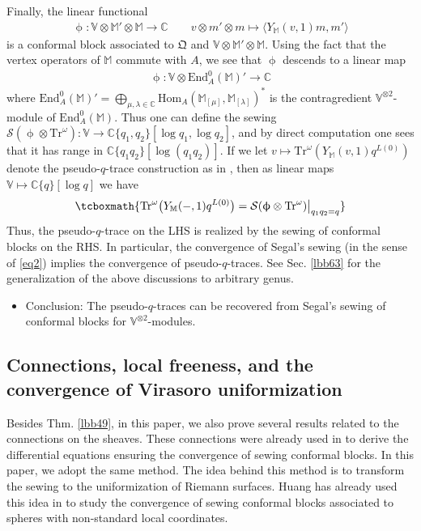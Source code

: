 \documentclass[11pt,b5paper,notitlepage]{article}
\theoremstyle{definition}
\theoremstyle{plain}
\newcommand{\Tr}{\mathrm{Tr}}
\newcommand{\End}{\mathrm{End}} %
\newcommand{\Hom}{\mathrm{Hom}}
\newcommand{\blt}{\bullet}
\newcommand{\Vbb}{\mathbb V}
\newcommand{\Mbb}{\mathbb M}
\newcommand{\Cbb}{\mathbb C}
\newcommand{\<}{\left\langle}
\renewcommand{\>}{\right\rangle}
\newcommand{\fx}{\mathfrak{X}}
\newcommand{\MD}{\mathcal{D}}
\newcommand{\MS}{\mathcal{S}}
\newcommand{\bk}[1]{\langle {#1}\rangle}
\newcommand{\fq}{{\mathfrak Q}}
\numberwithin{equation}{section}
\begin{document}
Finally, the linear functional
\begin{align*}
\upphi:\Vbb\otimes \Mbb'\otimes\Mbb\rightarrow\Cbb\qquad v\otimes m'\otimes m\mapsto\bk{Y_\Mbb(v,1)m,m'}
\end{align*}
is a conformal block associated to $\fq$ and $\Vbb\otimes\Mbb'\otimes\Mbb$. Using the fact that the vertex operators of $\Mbb$ commute with $A$, we see that $\upphi$ descends to a linear map
\begin{align*}
\upphi:\Vbb\otimes\End^0_A(\Mbb)'\rightarrow\Cbb
\end{align*}
where $\End^0_A(\Mbb)'=\bigoplus_{\mu,\lambda\in\Cbb}\Hom_A(\Mbb_{[\mu]},\Mbb_{[\lambda]})^*$ is the contragredient $\Vbb^{\otimes2}$-module of $\End^0_A(\Mbb)$. %
Thus one can define the sewing $\MS(\upphi\otimes\Tr^\omega):\Vbb\rightarrow\Cbb\{q_1,q_2\}[\log q_1,\log q_2]$, and by direct computation one sees that it has range in $\Cbb\{q_1q_2\}[\log(q_1q_2)]$. If we let $v\mapsto\Tr^\omega(Y_\Mbb(v,1)q^{L(0)})$ denote the pseudo-$q$-trace construction as in \cite{Miy-modular-invariance,AN-pseudo-trace,Fio-genus-1,Hua-modular-C2}, then as linear maps $\Vbb\mapsto\Cbb\{q\}[\log q]$ we have
\begin{align}
\tcboxmath{\Tr^\omega \big(Y_\Mbb(-,1)q^{L(0)}\big)=\MS(\upphi\otimes\Tr^\omega)\big|_{q_1q_2=q}}
\end{align}
Thus, the pseudo-$q$-trace on the LHS is realized by the sewing of conformal blocks on the RHS. In particular, the convergence of Segal's sewing (in the sense of \eqref{eq2}) implies the convergence of pseudo-$q$-traces. See Sec. \ref{lbb63} for the generalization of the above discussions to arbitrary genus.

\begin{itemize}
\item Conclusion: The pseudo-$q$-traces can be recovered from Segal's sewing of conformal blocks for $\Vbb^{\otimes2}$-modules.
\end{itemize}




\subsection{Connections, local freeness, and the convergence of Virasoro uniformization}


Besides Thm. \ref{lbb49}, in this paper, we also prove several results related to the connections on the sheaves. These connections were already used in \cite{Gui-sewingconvergence} to derive the differential equations ensuring the convergence of sewing conformal blocks. In this paper, we adopt the same method. The idea behind this method is to transform the sewing to the uniformization of Riemann surfaces. Huang has already used this idea in \cite{Hua97} to study the convergence of sewing conformal blocks associated to spheres with non-standard local coordinates. 
\end{document}
